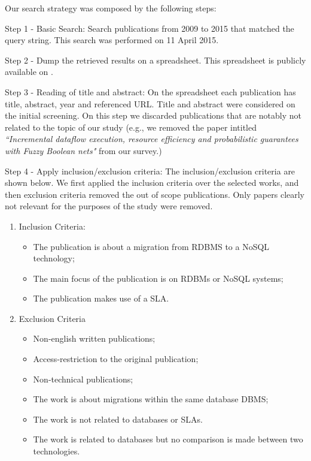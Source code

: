 \documentclass{article}
\begin{document}
Our search strategy was composed by the following steps:

Step 1 - Basic Search: Search publications from 2009 to 2015 that matched the query string. This search was performed on 11 April 2015. 

Step 2 - Dump the retrieved results on a spreadsheet. This spreadsheet is publicly available on \cite{systematicMappingSpreadsheet}.

Step 3 - Reading of title and abstract: On the spreadsheet each publication has title, abstract, year and referenced URL. Title and abstract were considered on the initial screening. On this step we discarded publications that are notably not related to the topic of our study (e.g., we removed the paper intitled \textit{``Incremental dataflow execution, resource efficiency and probabilistic guarantees with Fuzzy Boolean nets"} from our survey.) 

Step 4 - Apply inclusion/exclusion criteria: The inclusion/exclusion criteria are shown below. We first applied the inclusion criteria over the selected works, and then exclusion criteria removed the out of scope publications. Only papers clearly not relevant for the purposes of the study were removed.

\begin{enumerate}
    \item Inclusion Criteria: 
    \begin{itemize}
      \item The publication is about a migration from RDBMS to a NoSQL technology;
      \item The main focus of the publication is on RDBMs or NoSQL systems;
      \item The publication makes use of a SLA.
    \end{itemize}
    \item Exclusion Criteria
	\begin{itemize}
    \item Non-english written publications;
		\item Access-restriction to the original publication;
		\item Non-technical publications;
    \item The work is about migrations within the same database DBMS;
    \item The work is not related to databases or SLAs.
    \item The work is related to databases but no comparison is made between two technologies.
    \end{itemize}
    
\end{enumerate}
\end{document}
